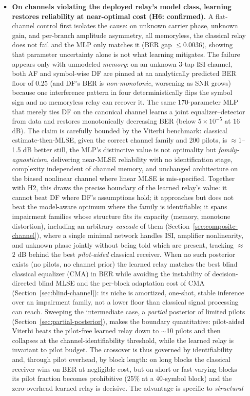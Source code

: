 \begin{itemize}
\tightlist
\item
  \textbf{On channels violating the deployed relay's model class, learning restores reliability at near-optimal cost (H6: confirmed).} A flat-channel control first isolates the cause: on unknown carrier phase, unknown gain, and per-branch amplitude asymmetry, all memoryless, the classical relay does not fail and the MLP only matches it (BER gap $\leq 0.0036$), showing that parameter uncertainty alone is not what learning mitigates. The failure appears only with unmodeled \emph{memory}: on an unknown 3-tap ISI channel, both AF and symbol-wise DF are pinned at an analytically predicted BER floor of $0.25$ (and DF's BER is \emph{non-monotonic}, worsening as SNR grows) because one interference pattern in four deterministically flips the symbol sign and no memoryless relay can recover it. The same 170-parameter MLP that merely ties DF on the canonical channel learns a joint equalizer--detector from data and restores monotonically decreasing BER (below $5\times10^{-5}$ at 16 dB). The claim is carefully bounded by the Viterbi benchmark: classical estimate-then-MLSE, given the correct channel family and 200 pilots, is $\approx$1--1.5 dB better still, the MLP's distinctive value is not optimality but \emph{family-agnosticism}, delivering near-MLSE reliability with no identification stage, complexity independent of channel memory, and unchanged architecture on the biased nonlinear channel where linear MLSE is mis-specified. Together with H2, this draws the precise boundary of the learned relay's value: it cannot beat DF where DF's assumptions hold; it approaches but does not beat the model-aware optimum where the family is identifiable; it spans impairment families whose structure fits its capacity (memory, monotone distortion), including an arbitrary \emph{cascade} of them (Section~\ref{sec:composite-channel}), where a single minimal network handles ISI, amplifier nonlinearity, and unknown phase jointly without being told which are present, tracking $\approx$2 dB behind the best \emph{pilot-aided} classical receiver. When no such posterior exists (no pilots, no channel prior) the learned relay matches the best blind classical equalizer (CMA) in BER while avoiding the instability of decision-directed blind MLSE and the per-block adaptation cost of CMA (Section~\ref{sec:blind-channel}): its niche is amortized, one-shot, stable inference over an impairment family, not a lower floor than classical signal processing can reach. Sweeping the intermediate case, a \emph{partial} posterior of limited pilots (Section~\ref{sec:partial-posterior}), makes the boundary quantitative: pilot-aided Viterbi beats the pilot-free learned relay down to $\sim$10 pilots and then collapses at the channel-identifiability threshold, while the learned relay is invariant to pilot budget. The crossover is thus governed by identifiability and, through pilot overhead, by block length: on long blocks the classical receiver wins on BER at negligible cost, but on short or fast-varying blocks its pilot fraction becomes prohibitive (25\% at a 40-symbol block) and the zero-overhead learned relay is decisive. The advantage is specific to \emph{structural} 
\end{itemize}
